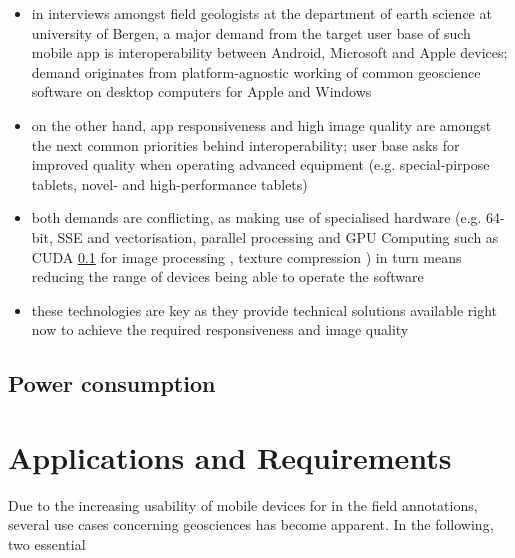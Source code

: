 \documentclass[review]{elsarticle}
\begin{document}
\begin{itemize}
\item in interviews amongst field geologists at the department of earth science at university of Bergen, a major demand from the target user base of such mobile app is interoperability between Android, Microsoft and Apple devices; demand originates from platform-agnostic working of common geoscience software on desktop computers for Apple and Windows
\item on the other hand, app responsiveness and high image quality are amongst the next common priorities behind interoperability; user base asks for improved quality when operating advanced equipment (e.g. special-pirpose tablets, novel- and high-performance tablets)
\item both demands are conflicting, as making use of specialised hardware (e.g. 64-bit, \gls{SSE} and vectorisation, parallel processing and GPU Computing such as CUDA \ref{} for image processing \cite{Heymann2007,Hudelist2014}, texture compression \cite{}) in turn means reducing the range of devices being able to operate the software
\item these technologies are key as they provide technical solutions available right now to achieve the required responsiveness and image quality
\end{itemize}

%

\subsection{Power consumption}

\begin{itemize}

\end{itemize}


\section{Applications and Requirements}
\label{sec:applications}
Due to the increasing usability of mobile devices for in the field annotations, several use cases concerning geosciences has become apparent. In the following, two essential 
\end{document}
